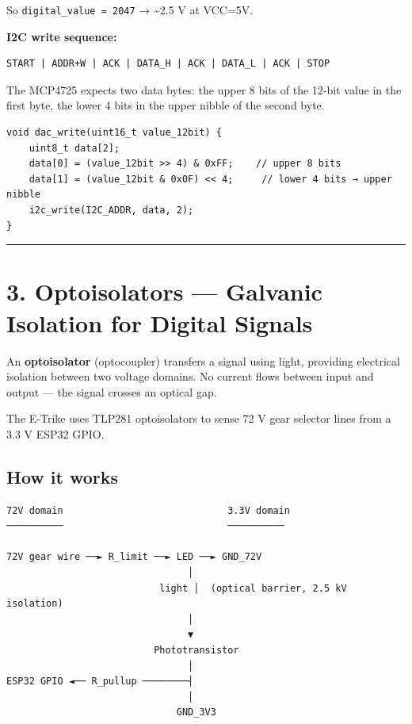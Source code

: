 \documentclass[12pt,a4paper,oneside]{report}
\begin{document}
So \texttt{digital\_value\ =\ 2047} → \textasciitilde2.5 V at VCC=5V.

\textbf{I2C write sequence:}

\begin{verbatim}
START | ADDR+W | ACK | DATA_H | ACK | DATA_L | ACK | STOP
\end{verbatim}

The MCP4725 expects two data bytes: the upper 8 bits of the 12-bit value in the
first byte, the lower 4 bits in the upper nibble of the second byte.

\begin{verbatim}
void dac_write(uint16_t value_12bit) {
    uint8_t data[2];
    data[0] = (value_12bit >> 4) & 0xFF;    // upper 8 bits
    data[1] = (value_12bit & 0x0F) << 4;     // lower 4 bits → upper nibble
    i2c_write(I2C_ADDR, data, 2);
}
\end{verbatim}

\begin{center}\rule{0.5\linewidth}{0.5pt}\end{center}

\section{3. Optoisolators --- Galvanic Isolation for Digital
Signals}\label{optoisolators-galvanic-isolation-for-digital-signals}

An \textbf{optoisolator} (optocoupler) transfers a signal using light, providing
electrical isolation between two voltage domains. No current flows between input
and output --- the signal crosses an optical gap.

The E-Trike uses TLP281 optoisolators to sense 72 V gear selector lines from a
3.3 V ESP32 GPIO.

\subsection{How it works}\label{how-it-works}

\begin{verbatim}
72V domain                             3.3V domain
──────────                             ──────────

72V gear wire ──► R_limit ──► LED ──► GND_72V
                                │
                           light │  (optical barrier, 2.5 kV isolation)
                                │
                                ▼
                          Phototransistor
                                │
ESP32 GPIO ◄── R_pullup ────────┤
                                │
                              GND_3V3
\end{verbatim}
\end{document}
